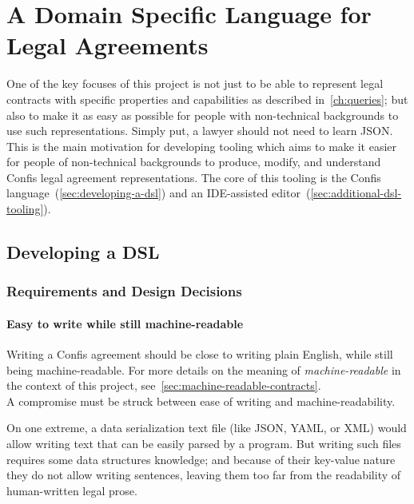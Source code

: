 \chapter{A Domain Specific Language for Legal Agreements}\label{ch:lang}

One of the key focuses of this project is not just to be able to represent legal contracts with specific properties and capabilities as described in~\autoref{ch:queries};
but also to make it as easy as possible for people with non-technical backgrounds to use such representations.
Simply put, a lawyer should not need to learn JSON.\\

This is the main motivation for developing tooling which aims to make it easier for people of non-technical backgrounds to produce, modify, and understand Confis legal agreement representations.
The core of this tooling is the Confis language~(\autoref{sec:developing-a-dsl}) and an IDE-assisted editor~(\autoref{sec:additional-dsl-tooling}).


\section{Developing a DSL}\label{sec:developing-a-dsl}

\subsection{Requirements and Design Decisions}\label{subsec:dsl:requirements}

\subsubsection{Easy to write while still machine-readable}

Writing a Confis agreement should be close to writing plain English, while still being machine-readable.
For more details on the meaning of \emph{machine-readable} in the context of this project, see~\autoref{sec:machine-readable-contracts}.\\


A compromise must be struck between ease of writing and machine-readability.

On one extreme, a data serialization text file (like JSON, YAML, or XML) would allow writing text that can be easily parsed by a program.
But writing such files requires some data structures knowledge;
and because of their key-value nature they do not allow writing sentences, leaving them too far from the readability of human-written legal prose.

